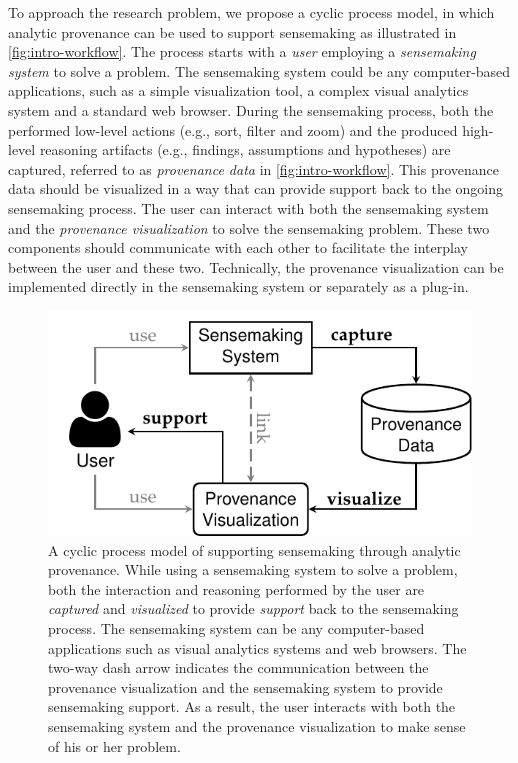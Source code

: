 To approach the research problem, we propose a cyclic process model, in which analytic provenance can be used to support sensemaking as illustrated in \autoref{fig:intro-workflow}. The process starts with a \emph{user} employing a \emph{sensemaking system} to solve a problem. The sensemaking system could be any computer-based applications, such as a simple visualization tool, a complex visual analytics system and a standard web browser. During the sensemaking process, both the performed low-level actions (e.g., sort, filter and zoom) and the produced high-level reasoning artifacts (e.g., findings, assumptions and hypotheses) are captured, referred to as \emph{provenance data} in \autoref{fig:intro-workflow}. This provenance data should be visualized in a way that can provide support back to the ongoing sensemaking process. The user can interact with both the sensemaking system and the \emph{provenance visualization} to solve the sensemaking problem. These two components should communicate with each other to facilitate the interplay between the user and these two. Technically, the provenance visualization can be implemented directly in the sensemaking system or separately as a plug-in.

\begin{figure}[!htb]
	\centering
	\includegraphics{workflow}
	\caption{A cyclic process model of supporting sensemaking through analytic provenance. While using a sensemaking system to solve a problem, both the interaction and reasoning performed by the user are \emph{captured} and \emph{visualized} to provide \emph{support} back to the sensemaking process. The sensemaking system can be any computer-based applications such as visual analytics systems and web browsers. The two-way dash arrow indicates the communication between the provenance visualization and the sensemaking system to provide sensemaking support. As a result, the user interacts with both the sensemaking system and the provenance visualization to make sense of his or her problem.}
	\label{fig:intro-workflow}
\end{figure}

